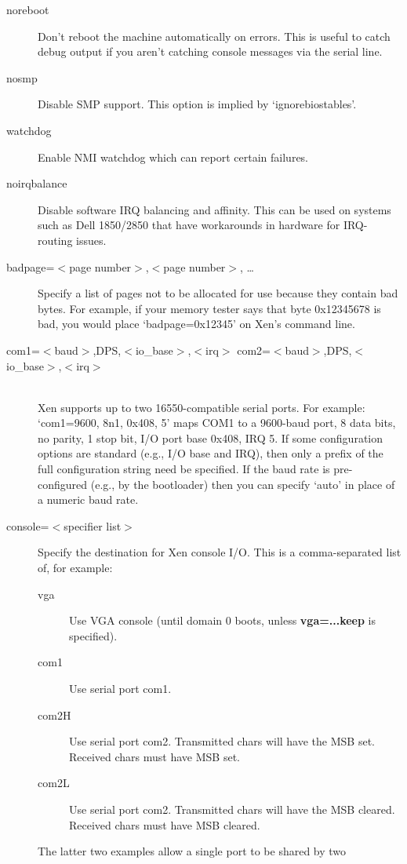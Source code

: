 \documentclass[11pt,twoside,final,openright]{report}
\begin{document}
\begin{description}
\item [ noreboot ] Don't reboot the machine automatically on errors.
  This is useful to catch debug output if you aren't catching console
  messages via the serial line.
\item [ nosmp ] Disable SMP support.  This option is implied by
  `ignorebiostables'.
\item [ watchdog ] Enable NMI watchdog which can report certain
  failures.
\item [ noirqbalance ] Disable software IRQ balancing and affinity.
  This can be used on systems such as Dell 1850/2850 that have
  workarounds in hardware for IRQ-routing issues.
\item [ badpage=$<$page number$>$,$<$page number$>$, \ldots ] Specify
  a list of pages not to be allocated for use because they contain bad
  bytes. For example, if your memory tester says that byte 0x12345678
  is bad, you would place `badpage=0x12345' on Xen's command line.
\item [ com1=$<$baud$>$,DPS,$<$io\_base$>$,$<$irq$>$
  com2=$<$baud$>$,DPS,$<$io\_base$>$,$<$irq$>$ ] \mbox{}\\
  Xen supports up to two 16550-compatible serial ports.  For example:
  `com1=9600, 8n1, 0x408, 5' maps COM1 to a 9600-baud port, 8 data
  bits, no parity, 1 stop bit, I/O port base 0x408, IRQ 5.  If some
  configuration options are standard (e.g., I/O base and IRQ), then
  only a prefix of the full configuration string need be specified. If
  the baud rate is pre-configured (e.g., by the bootloader) then you
  can specify `auto' in place of a numeric baud rate.
\item [ console=$<$specifier list$>$ ] Specify the destination for Xen
  console I/O.  This is a comma-separated list of, for example:
  \begin{description}
  \item[ vga ] Use VGA console (until domain 0 boots, unless {\bf
  vga=...keep } is specified).
  \item[ com1 ] Use serial port com1.
  \item[ com2H ] Use serial port com2. Transmitted chars will have the
    MSB set. Received chars must have MSB set.
  \item[ com2L] Use serial port com2. Transmitted chars will have the
    MSB cleared. Received chars must have MSB cleared.
  \end{description}
  The latter two examples allow a single port to be shared by two

\end{description}
\end{document}
